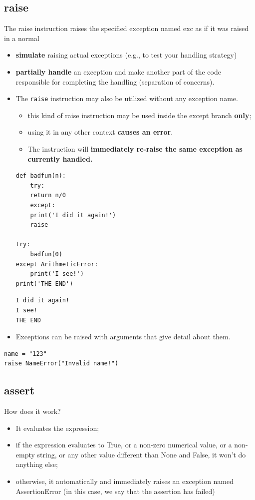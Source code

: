 \documentclass[11pt]{article}
\begin{document}
\subsection{raise}
\label{sec:org836145e}
The raise instruction raises the specified exception named exc as if
it was raised in a normal
\begin{itemize}
\item \textbf{simulate} raising actual exceptions (e.g., to test your handling
strategy)
\item \textbf{partially handle} an exception and make another part of the code
responsible for completing the handling (separation of concerns).
\item The \texttt{raise} instruction may also be utilized without any exception
name.
\begin{itemize}
\item this kind of raise instruction may be used inside the except
branch \textbf{only};
\item using it in any other context \textbf{causes an error}.
\item The instruction will \textbf{immediately re-raise the same exception as
currently handled.}
\end{itemize}
\begin{verbatim}
def badfun(n):
    try:
	return n/0
    except:
	print('I did it again!')
	raise

try:
    badfun(0)
except ArithmeticError:
    print('I see!')
print('THE END')
\end{verbatim}

\begin{verbatim}
I did it again!
I see!
THE END
\end{verbatim}

\item Exceptions can be raised with arguments that give detail about them.
\end{itemize}

\begin{verbatim}
name = "123"
raise NameError("Invalid name!")
\end{verbatim}

\subsection{assert}
\label{sec:org686c59b}
How does it work?
\begin{itemize}
\item It evaluates the expression;
\item if the expression evaluates to True, or a non-zero numerical value,
or a non-empty string, or any other value different than None and
False, it won’t do anything else;
\item otherwise, it automatically and immediately raises an exception
named AssertionError (in this case, we say that the assertion has
failed)
\end{itemize}
\end{document}
